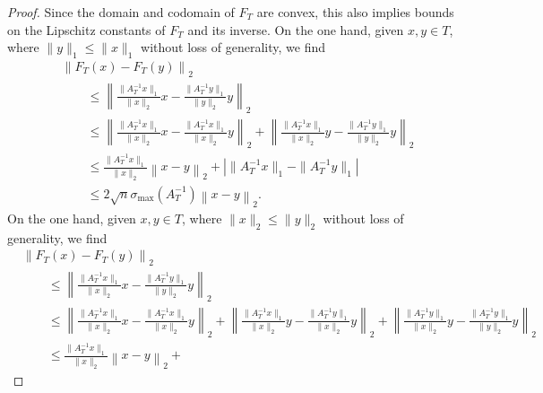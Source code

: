 \documentclass[10pt,a4paper]{article}
\begin{document}
\begin{proof}
    Since the domain and codomain of $F_{T}$ are convex, 
    this also implies bounds on the Lipschitz constants of $F_{T}$ and its inverse. 
\color{red}
    On the one hand, given $x, y \in T$, 
    where $\| y \|_{1} \leq \| x \|_{1}$ without loss of generality, we find 
    \begin{align*}
        &
        \left\| F_T(x) - F_T(y) \right\|_{2}
        \\&\qquad 
        \leq 
        \left\| 
            \frac{ \| A_{T}^{-1} x \|_{1} }{ \|x\|_2 } x - \frac{ \| A_{T}^{-1} y \|_{1} }{ \|y\|_2 } y
        \right\|_{2}
        \\&\qquad 
        \leq 
        \left\| 
            \frac{ \| A_{T}^{-1} x \|_{1} }{ \|x\|_2 } x - \frac{ \| A_{T}^{-1} x \|_{1} }{ \|x\|_2 } y
        \right\|_{2}
        +
        \left\| 
            \frac{ \| A_{T}^{-1} x \|_{1} }{ \|x\|_2 } y - \frac{ \| A_{T}^{-1} y \|_{1} }{ \|y\|_2 } y
        \right\|_{2}
        \\&\qquad 
        \leq 
        \frac{ \| A_{T}^{-1} x \|_{1} }{ \|x\|_2 } 
        \left\| 
            x - y
        \right\|_{2}
        +
        \left| \|A_{T}^{-1} x\|_1 - \|A_{T}^{-1} y\|_1 \right|
        \\&\qquad 
        \leq 
        2\sqrt{n} \sigma_{\max}(A_{T}^{-1}) 
        \left\| x - y \right\|_{2}
        .
    \end{align*}
    On the one hand, given $x, y \in T$, 
    where $\| x \|_{2} \leq \| y \|_{2}$ without loss of generality, we find 
    \begin{align*}
        &
        \left\| F_T(x) - F_T(y) \right\|_{2}
        \\&\qquad 
        \leq 
        \left\| 
            \frac{ \| A_{T}^{-1} x \|_{1} }{ \|x\|_2 } x - \frac{ \| A_{T}^{-1} y \|_{1} }{ \|y\|_2 } y
        \right\|_{2}
        \\&\qquad 
        \leq 
        \left\| 
            \frac{ \| A_{T}^{-1} x \|_{1} }{ \|x\|_2 } x - \frac{ \| A_{T}^{-1} x \|_{1} }{ \|x\|_2 } y
        \right\|_{2}
        +
        \left\| 
            \frac{ \| A_{T}^{-1} x \|_{1} }{ \|x\|_2 } y - \frac{ \| A_{T}^{-1} y \|_{1} }{ \|x\|_2 } y
        \right\|_{2}
        +
        \left\| 
            \frac{ \| A_{T}^{-1} y \|_{1} }{ \|x\|_2 } y - \frac{ \| A_{T}^{-1} y \|_{1} }{ \|y\|_2 } y
        \right\|_{2}
        \\&\qquad 
        \leq 
        \frac{ \| A_{T}^{-1} x \|_{1} }{ \|x\|_2 } 
        \left\| 
            x - y
        \right\|_{2}
        +

\end{align*}
\end{proof}
\end{document}
